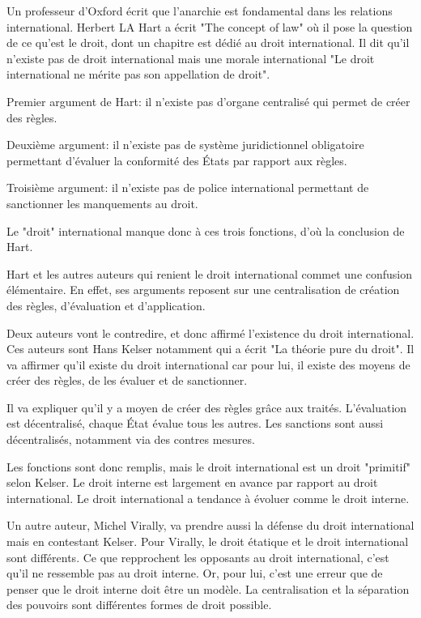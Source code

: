 \documentclass[12pt, a4paper, openany]{book}
\begin{document}
Un professeur d'Oxford écrit que l'anarchie est fondamental dans les relations international. Herbert LA Hart a écrit "The concept of law" où il pose la question de ce qu'est le droit, dont un chapitre est dédié au droit international. Il dit qu'il n'existe pas de droit international mais une morale international "Le droit international ne mérite pas son appellation de droit".

Premier argument de Hart: il n'existe pas d'organe centralisé qui permet de créer des règles.

Deuxième argument: il n'existe pas de système juridictionnel obligatoire permettant d'évaluer la conformité des États par rapport aux règles.

Troisième argument: il n'existe pas de police international permettant de sanctionner les manquements au droit.

Le "droit" international manque donc à ces trois fonctions, d'où la conclusion de Hart.


Hart et les autres auteurs qui renient le droit international commet une confusion élémentaire. En effet, ses arguments reposent sur une centralisation de création des règles, d'évaluation et d'application.

Deux auteurs vont le contredire, et donc affirmé l'existence du droit international. Ces auteurs sont Hans Kelser notamment qui a écrit "La théorie pure du droit". Il va affirmer qu'il existe du droit international car pour lui, il existe des moyens de créer des règles, de les évaluer et de sanctionner.

Il va expliquer qu'il y a moyen de créer des règles grâce aux traités. L'évaluation est décentralisé, chaque État évalue tous les autres. Les sanctions sont aussi décentralisés, notamment via des contres mesures.

Les fonctions sont donc remplis, mais le droit international est un droit "primitif" selon Kelser. Le droit interne est largement en avance par rapport au droit international. Le droit international a tendance à évoluer comme le droit interne.

Un autre auteur, Michel Virally, va prendre aussi la défense du droit international mais en contestant Kelser. Pour Virally, le droit étatique et le droit international sont différents. Ce que repprochent les opposants au droit international, c'est qu'il ne ressemble pas au droit interne. Or, pour lui, c'est une erreur que de penser que le droit interne doit être un modèle. La centralisation et la séparation des pouvoirs sont différentes formes de droit possible.
\end{document}
